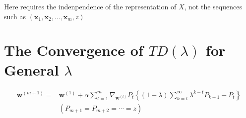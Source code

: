 Here requires the indenpendence of the 
representation of $ X $, not the sequences such as
$ (\textbf{x}_1, \textbf{x}_2, \dots, \textbf{x}_m, z) $ 

\section{The Convergence of $TD(\lambda)$ for General $\lambda$~\cite{Dayan1992}}

\begin{align*}
    \label{eq:6}
    \mathbf{w}^{(m+1)} 
    =&\mathbf{w}^{(1)} + \alpha \sum^{m}_{t=1} \nabla_{\mathbf{w}^{(t)}} P_t
    \left\{ (1-\lambda)\sum^{\infty}_{k=t}\lambda^{k-t} P_{k+1} - P_t  \right\} \\
     & (P_{m+1} = P_{m+2} = \cdots = z)
\end{align*}

